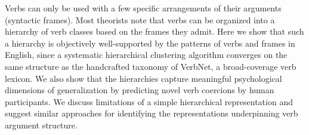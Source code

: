 Verbs can only be used with a few specific arrangements of their arguments (syntactic frames). Most theorists note that verbs can be organized into a hierarchy of verb classes based on the frames they admit. Here we show that such a hierarchy is objectively well-supported by the patterns of verbs and frames in English, since a systematic hierarchical clustering algorithm converges on the same structure as the handcrafted taxonomy of VerbNet, a broad-coverage verb lexicon. We also show that the hierarchies capture meaningful psychological dimensions of generalization by predicting novel verb coercions by human participants. We discuss limitations of a simple hierarchical representation and suggest similar approaches for identifying the representations underpinning verb argument structure.
